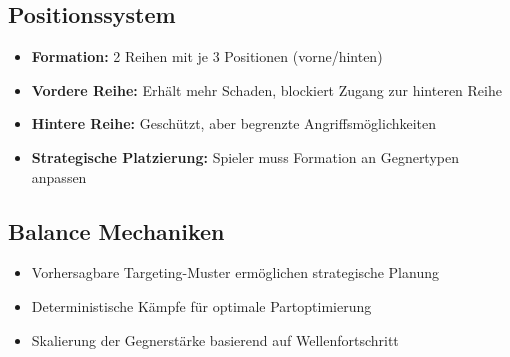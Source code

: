 \subsection{Positionssystem}
\begin{itemize}
    \item \textbf{Formation:} 2 Reihen mit je 3 Positionen (vorne/hinten)
    \item \textbf{Vordere Reihe:} Erhält mehr Schaden, blockiert Zugang zur hinteren Reihe
    \item \textbf{Hintere Reihe:} Geschützt, aber begrenzte Angriffsmöglichkeiten
    \item \textbf{Strategische Platzierung:} Spieler muss Formation an Gegnertypen anpassen
\end{itemize}

\subsection{Balance Mechaniken}
\begin{itemize}
    \item Vorhersagbare Targeting-Muster ermöglichen strategische Planung
    \item Deterministische Kämpfe für optimale Partoptimierung
    \item Skalierung der Gegnerstärke basierend auf Wellenfortschritt
\end{itemize}
